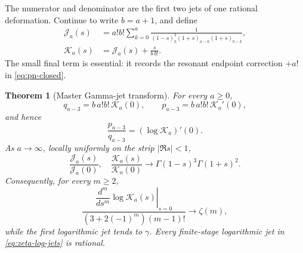 \documentclass[11pt]{article}
\newtheorem{theorem}{Theorem}[section]
\theoremstyle{definition}
\theoremstyle{remark}
\begin{document}
The numerator and denominator are the first two jets of one rational
deformation.  Continue to write \(b=a+1\), and define
\begin{align}
 \mathscr J_a(s)&=a!b!\sum_{k=0}^a
 \frac1{(1-s)_k^3(1+s)_{a-k}(1+s)_{b-k}},
 \label{eq:Jas-def}\\
 \mathscr K_a(s)&=\mathscr J_a(s)+\frac{s}{b\,b!}.
 \label{eq:Kas-def}
\end{align}
The small final term is essential: it records the resonant endpoint
correction \(+a!\) in \eqref{eq:pn-closed}.

\begin{theorem}[Master Gamma-jet transform]
\label{thm:gamma-jet}
For every \(a\ge0\),
\begin{equation}\label{eq:zero-first-jets}
 \boxed{\displaystyle
 q_{a-3}=b\,a!b!\,\mathscr K_a(0),\qquad
 p_{a-3}=b\,a!b!\,\mathscr K_a'(0),}
\end{equation}
and hence
\begin{equation}\label{eq:gamma-first-log-jet}
 \frac{p_{a-3}}{q_{a-3}}=(\log\mathscr K_a)'(0).
\end{equation}
As \(a\to\infty\), locally uniformly on the strip \(|\Re s|<1\),
\begin{equation}\label{eq:Gamma-master-limit}
 \boxed{\displaystyle
 \frac{\mathscr J_a(s)}{\mathscr J_a(0)},\quad
 \frac{\mathscr K_a(s)}{\mathscr K_a(0)}
 \longrightarrow
 \Gamma(1-s)^3\Gamma(1+s)^2.}
\end{equation}
Consequently, for every \(m\ge2\),
\begin{equation}\label{eq:zeta-log-jets}
 \boxed{\displaystyle
 \frac{\left.\dfrac{d^m}{ds^m}\log\mathscr K_a(s)\right|_{s=0}}
 {(3+2(-1)^m)(m-1)!}\longrightarrow\zeta(m),}
\end{equation}
while the first logarithmic jet tends to \(\gamma\).
Every finite-stage logarithmic jet in \eqref{eq:zeta-log-jets} is rational.
\end{theorem}
\end{document}
